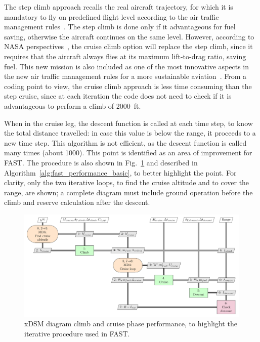 The step climb approach recalls the real aircraft trajectory, for which it is mandatory to fly on predefined flight level according to the air traffic management rules~\cite{bib:mission_path_def}. 
The step climb is done only if it advantageous for fuel saving, otherwise the aircraft continues on the same level. 
However, according to NASA perspectives~\cite{bib:bradley_sugar_p1}, the cruise climb option will replace the step climb, since it requires that the aircraft always flies at its maximum lift-to-drag ratio, saving fuel. 
This new mission is also included as one of the most innovative aspects in the new air traffic management rules for a more sustainable aviation~\cite{bib:bradley_sugar_p1}.
From a coding point to view, the cruise climb approach is less time consuming than the step cruise, since at each iteration the code does not need to check if it is advantageous to perform a climb of 2000~ft.

When in the cruise leg, the descent function is called at each time step, to know the total distance travelled: in case this value is below the range, it proceeds to a new time step. 
This algorithm is not efficient, as the descent function is called many times (about 1000). 
This point is identified as an area of improvement for FAST. 
The procedure is also shown in Fig.~\ref{fig:fast_performance_basic} and described in Algorithm~\ref{alg:fast_performance_basic}, to better highlight the point. 
For clarity, only the two iterative loops, to find the cruise altitude and to cover the range, are shown; a complete diagram must include ground operation before the climb and reserve calculation after the descent. 
\begin{figure}[!h]
	\centering
	\includegraphics[keepaspectratio, width=\textwidth]{images/chap2/FAST_performance}
	\caption{xDSM diagram climb and cruise phase performance, to highlight the iterative procedure used in FAST.}
	\label{fig:fast_performance_basic}
\end{figure}

